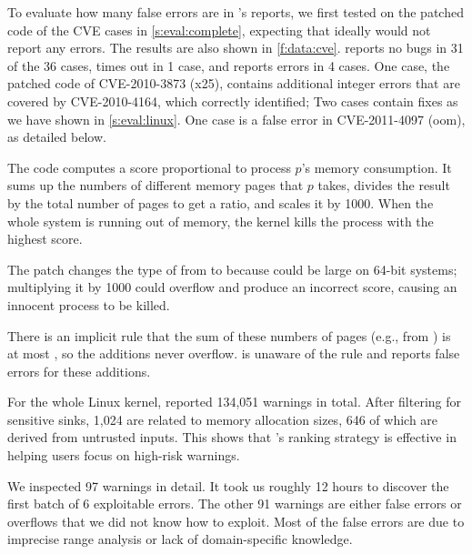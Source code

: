 To evaluate how many false errors are in \sys's reports,
we first tested \sys on the patched code of the CVE cases
in \autoref{s:eval:complete},
expecting that ideally \sys would not report any errors.
The results are also shown in \autoref{f:data:cve}.
\sys reports no bugs in 31 of the 36 cases, times out in 1 case, and
reports errors in 4 cases.
%
One case, the patched code of CVE-2010-3873 (x25),
contains additional integer errors that are covered by CVE-2010-4164,
which \sys correctly identified;
Two cases contain fixes as we have shown in \autoref{s:eval:linux}.
One case is a false error in CVE-2011-4097 (oom), as detailed below.

The code
computes a score proportional to process $p$'s memory consumption.
It sums up the numbers of different 
memory pages that $p$ takes, divides the result by the total number
of pages to get a ratio, and scales it by 1000.
When the whole system is running out of memory,
the kernel kills the process with the highest score.

The patch changes the type of  from  to  because
 could be large on 64-bit systems; multiplying it by
1000 could overflow and produce an incorrect score,
causing an innocent process to be killed.

There is an implicit rule that the sum of these numbers of pages
(e.g., from ) is at most , so the
additions never overflow.  \sys is unaware of the rule and
reports false errors for these additions.



For the whole Linux kernel, \sys reported 134,051 warnings in total.
After filtering for sensitive sinks, 1,024 are related to memory
allocation sizes, 646 of which are derived from untrusted inputs.
This shows that \sys's ranking strategy is effective in helping users
focus on high-risk warnings.

We inspected 97 warnings in detail.  It took us roughly 12 hours
to discover the first batch of 6 exploitable errors.  The other 91
warnings are either false errors or overflows that we did not know
how to exploit.  Most of the false errors are due to imprecise range
analysis or lack of domain-specific knowledge.


